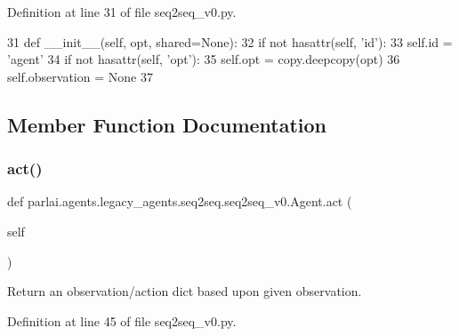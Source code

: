 Definition at line 31 of file seq2seq\+\_\+v0.\+py.


\begin{DoxyCode}
31     \textcolor{keyword}{def }\_\_init\_\_(self, opt, shared=None):
32         \textcolor{keywordflow}{if} \textcolor{keywordflow}{not} hasattr(self, \textcolor{stringliteral}{'id'}):
33             self.id = \textcolor{stringliteral}{'agent'}
34         \textcolor{keywordflow}{if} \textcolor{keywordflow}{not} hasattr(self, \textcolor{stringliteral}{'opt'}):
35             self.opt = copy.deepcopy(opt)
36         self.observation = \textcolor{keywordtype}{None}
37 
\end{DoxyCode}


\subsection{Member Function Documentation}
\mbox{\label{classparlai_1_1agents_1_1legacy__agents_1_1seq2seq_1_1seq2seq__v0_1_1Agent_a403f4e9f07a342da898de6768f857bf3}} 
\subsubsection{\texorpdfstring{act()}{act()}}
{\footnotesize\ttfamily def parlai.\+agents.\+legacy\+\_\+agents.\+seq2seq.\+seq2seq\+\_\+v0.\+Agent.\+act (\begin{DoxyParamCaption}\item[{}]{self }\end{DoxyParamCaption})}

\begin{DoxyVerb}Return an observation/action dict based upon given observation.
\end{DoxyVerb}
 

Definition at line 45 of file seq2seq\+\_\+v0.\+py.


